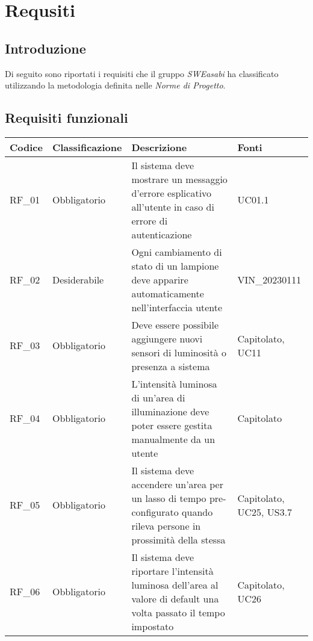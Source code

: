 \chapter{Requsiti}

\section{Introduzione}
Di seguito sono riportati i requisiti che il gruppo \textit{SWEasabi} ha classificato utilizzando la metodologia definita nelle \textit{Norme di Progetto}.

\section{Requisiti funzionali} \label{requisiti-funzionali}

\begin{center}
    \begin{xltabular}{\linewidth}{|l|l|X|l|}
        \hline
        \textbf{Codice} & \textbf{Classificazione} & \textbf{Descrizione} & \textbf{Fonti} \\
        \hline
        RF\_01 & Obbligatorio & Il sistema deve mostrare un messaggio d'errore esplicativo all'utente in caso di errore di autenticazione & UC01.1 \\

        \hline
        RF\_02 & Desiderabile &Ogni cambiamento di stato di un lampione deve apparire automaticamente nell'interfaccia utente & VIN\_20230111\\

        \hline
        RF\_03 & Obbligatorio & Deve essere possibile aggiungere nuovi sensori di luminosità o presenza a sistema & Capitolato, UC11 \\

        \hline
        RF\_04 & Obbligatorio & L'intensità luminosa di un'area di illuminazione deve poter essere gestita manualmente da un utente & Capitolato\\

        \hline
        RF\_05 & Obbligatorio & Il sistema deve accendere un'area per un lasso di tempo pre-configurato quando rileva persone in prossimità della stessa & Capitolato, UC25, US3.7 \\

        \hline
        RF\_06 & Obbligatorio & Il sistema deve riportare l'intensità luminosa dell'area al valore di default una volta passato il tempo impostato & Capitolato, UC26 \\


\end{xltabular}
\end{center}
